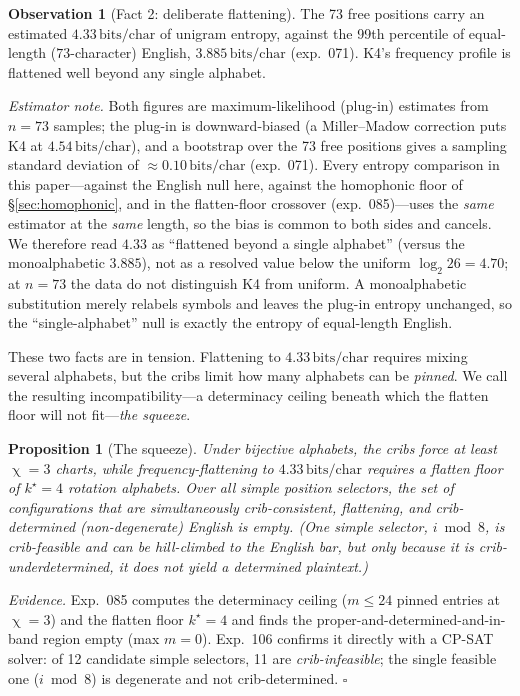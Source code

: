 \documentclass[11pt]{article}
\theoremstyle{plain}
\newtheorem{proposition}{Proposition}
\theoremstyle{definition}
\newtheorem{observation}{Observation}
\newcommand{\K}{\textsf{K4}}
\newcommand{\bits}{\,\text{bits/char}}
\DeclareMathOperator{\chrom}{\chi}
\begin{document}
\begin{observation}[Fact 2: deliberate flattening]\label{obs:fact2}
The 73 free positions carry an estimated $4.33\bits$ of unigram entropy, against the
99th percentile of equal-length ($73$-character) English, $3.885\bits$ (exp.~071).
\K{}'s frequency profile is flattened well beyond any single alphabet.
\end{observation}
\noindent
\emph{Estimator note.} Both figures are maximum-likelihood (plug-in) estimates from
$n{=}73$ samples; the plug-in is downward-biased (a Miller--Madow correction puts
\K{} at $4.54\bits$), and a bootstrap over the 73 free positions gives a sampling
standard deviation of ${\approx}0.10\bits$ (exp.~071). Every entropy comparison in
this paper---against the English null here, against the homophonic floor of
\S\ref{sec:homophonic}, and in the flatten-floor crossover (exp.~085)---uses the
\emph{same} estimator at the \emph{same} length, so the bias is common to both sides
and cancels. We therefore
read $4.33$ as ``flattened beyond a single alphabet'' (versus the monoalphabetic
$3.885$), not as a resolved value below the uniform $\log_2 26 = 4.70$; at $n{=}73$
the data do not distinguish \K{} from uniform. A monoalphabetic substitution merely
relabels symbols and leaves the plug-in entropy unchanged, so the ``single-alphabet''
null is exactly the entropy of equal-length English.

These two facts are in tension. Flattening to $4.33\bits$ requires mixing several
alphabets, but the cribs limit how many alphabets can be \emph{pinned}. We call the
resulting incompatibility---a determinacy ceiling beneath which the flatten floor
will not fit---\emph{the squeeze}.

\begin{proposition}[The squeeze]\label{prop:squeeze}
Under bijective alphabets, the cribs force at least $\chrom=3$ charts, while
frequency-flattening to $4.33\bits$ requires a flatten floor of $k^\star=4$ rotation
alphabets. Over all simple position selectors, the set of configurations that are
simultaneously crib-consistent, flattening, and \emph{crib-determined}
(non-degenerate) English is \emph{empty}. (One simple selector, $i\bmod 8$, is
crib-\emph{feasible} and can be hill-climbed to the English bar, but only because it
is crib-\emph{under}determined, it does not yield a determined plaintext.)
\end{proposition}

\noindent\emph{Evidence.} Exp.~085 computes the determinacy ceiling
($m\le24$ pinned entries at $\chrom=3$) and the flatten floor $k^\star=4$ and finds
the proper-and-determined-and-in-band region empty (max $m=0$). Exp.~106 confirms it
directly with a CP-SAT solver: of 12 candidate simple selectors, 11 are
\emph{crib-infeasible}; the single feasible one ($i\bmod 8$) is degenerate and not
crib-determined. \hfill$\square$
\end{document}
